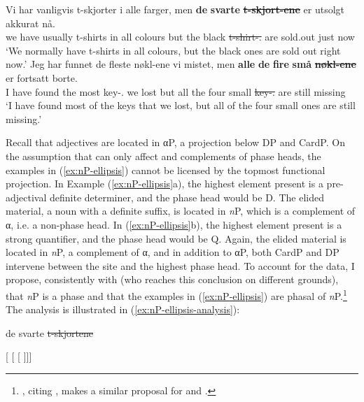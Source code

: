 \documentclass[output=paper]{langsci/langscibook}
\begin{document}
\ea\label{ex:nP-ellipsis} 
    \ea
    \gll Vi har vanligvis t-skjorter i alle farger, men \textbf{de}
    \textbf{svarte}  \textbf{\sout{t-skjort-ene}} er utsolgt akkurat n\aa{}.\\
        we have usually t-shirts in all colours but the black
        \sout{t-shirt-\Pl.\Def{}} are sold.out just now\\
    \glt `We normally have t-shirts in all colours, but the black ones are sold out right now.'
    \ex
    \gll Jeg har funnet de fleste nøkl-ene vi mistet, men \textbf{alle}
    \textbf{de} \textbf{fire} \textbf{sm\aa{}} \textbf{\sout{nøkl-ene}} er fortsatt borte.\\
    I have found the most key-\Pl.\Def{} we lost but all the four small
    \sout{key-\Pl.\Def{}} are still missing\\
    \glt `I have found most of the keys that we lost, but all of the four
    small ones are still missing.'
    \z
\z

\noindent Recall that adjectives are located in α{}P, a projection
below DP and CardP. On the assumption that  can only affect  and
complements of phase heads, the examples in (\ref{ex:nP-ellipsis}) cannot be
licensed by the topmost functional projection. In Example
(\ref{ex:nP-ellipsis}a), the highest element present is a pre-adjectival
definite determiner, and the phase head would be D. The elided material, a
noun with a definite suffix, is located in \emph{n}P, which is a
complement of α{}, i.e. a non-phase head. In (\ref{ex:nP-ellipsis}b),
the highest element present is a strong quantifier, and the phase head would
be Q. Again, the elided material is  located in \emph{n}P, a complement of
α{}, and in addition to  α{}P, both CardP and DP intervene
between the  site and the highest phase head. To account for the data,
I propose, consistently with \citet{julien2005nominal} (who reaches this
conclusion on different grounds), that \emph{n}P is a phase and that the
examples in (\ref{ex:nP-ellipsis}) are phasal  of
\emph{n}P.\footnote{\citet{simpson2017parallels}, citing
    \citet{ruda2016NPellipsis}, makes a similar proposal for  and
.} The analysis is illustrated in (\ref{ex:nP-ellipsis-analysis}):

\ea\label{ex:nP-ellipsis-analysis}
		\ea
		de svarte \sout{t-skjortene}

	[ [ [ ]]]
\end{document}
